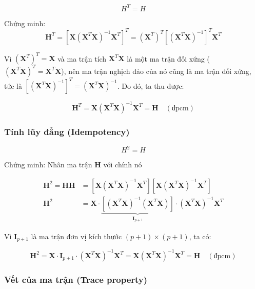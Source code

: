 \begin{equation}
    H^T = H
\end{equation}

\noindent Chứng minh: $$\mathbf{H}^T = \left[ \mathbf{X}(\mathbf{X}^T\mathbf{X})^{-1}\mathbf{X}^T \right]^T = (\mathbf{X}^T)^T \left[ (\mathbf{X}^T\mathbf{X})^{-1} \right]^T \mathbf{X}^T$$

Vì $(\mathbf{X}^T)^T = \mathbf{X}$ và ma trận tích $\mathbf{X}^T\mathbf{X}$ là một ma trận đối xứng ($\left(\mathbf{X}^T\mathbf{X}\right)^T = \mathbf{X}^T\mathbf{X}$), nên ma trận nghịch đảo của nó cũng là ma trận đối xứng, tức là $\left[ (\mathbf{X}^T\mathbf{X})^{-1} \right]^T = (\mathbf{X}^T\mathbf{X})^{-1}$. Do đó, ta thu được:

\begin{equation}
    \mathbf{H}^T = \mathbf{X}(\mathbf{X}^T\mathbf{X})^{-1}\mathbf{X}^T = \mathbf{H} \quad (\text{đpcm})
\end{equation}

\subsubsection{Tính lũy đẳng (Idempotency)}

\begin{equation}
    H^2 = H
\end{equation}

\noindent Chứng minh: Nhân ma trận $\mathbf{H}$ với chính nó

\begin{align}
    \mathbf{H}^2 = \mathbf{H}\mathbf{H} &= \left[ \mathbf{X}(\mathbf{X}^T\mathbf{X})^{-1}\mathbf{X}^T \right] \left[ \mathbf{X}(\mathbf{X}^T\mathbf{X})^{-1}\mathbf{X}^T \right] \\ 
    \mathbf{H}^2 &= \mathbf{X} \cdot \underbrace{\left[(\mathbf{X}^T\mathbf{X})^{-1} (\mathbf{X}^T\mathbf{X})\right]}_{\mathbf{I}_{p+1}} \cdot (\mathbf{X}^T\mathbf{X})^{-1}\mathbf{X}^T
\end{align}

Vì $\mathbf{I}_{p+1}$ là ma trận đơn vị kích thước $(p+1) \times (p+1)$, ta có:

$$\mathbf{H}^2 = \mathbf{X} \cdot \mathbf{I}_{p+1} \cdot (\mathbf{X}^T\mathbf{X})^{-1}\mathbf{X}^T = \mathbf{X}(\mathbf{X}^T\mathbf{X})^{-1}\mathbf{X}^T = \mathbf{H} \quad (\text{đpcm})$$

\subsubsection{Vết của ma trận (Trace property)}

